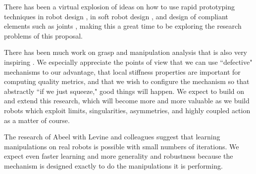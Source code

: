 There has been a virtual explosion of ideas on how to use rapid prototyping techniques in robot design \cite{dollar2010highly}, in soft robot design \cite{hirose1978development,deimel2015novel,rus2015design,wehner2014pneumatic,polygerinos2015modeling}, and design of compliant elements such as joints \cite{kuo2016novel}, making this a great time to be exploring the research problems of this proposal.

There has been much work on grasp and manipulation analysis that is also very inspiring \cite{trinkle1990planning,prattichizzo2013motion,prattichizzo1997consistent,lin2000stiffness}.  We especially appreciate the points of view that we can use ``defective" mechanisms to our advantage, that local stiffness properties are important for computing quality metrics, and that we wish to configure the mechanism so that abstractly ``if we just squeeze," good things will happen.    We expect to build on and extend this research, which will become more and more valuable as we build robots which exploit limits, singularities, asymmetries, and highly coupled action as a matter of course.

The research of Abeel with Levine and colleagues \cite{finn2015deep,kumaroptimal,levine2015learning} suggest that learning manipulations on real robots is possible with small numbers of iterations.   We expect even faster learning and more generality and robustness because the mechanism is designed exactly to do the manipulations it is performing.